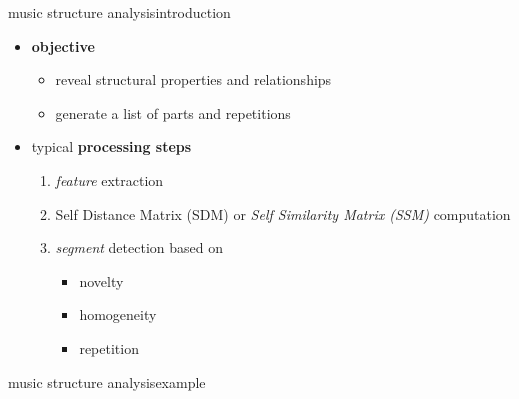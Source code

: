         \begin{frame}{music structure analysis}{introduction}
            \begin{itemize}
                \item   \textbf{objective}
                    \begin{itemize}
                        \item   reveal structural properties and relationships
                        \item   generate a list of parts and repetitions
                    \end{itemize}
                \bigskip
                \item   typical \textbf{processing steps}
                    \begin{enumerate}
                        \item   \textit{feature} extraction
                        \smallskip
                        \item   Self Distance Matrix (SDM) or \textit{Self Similarity Matrix (SSM)} computation
                        \smallskip
                        \item   \textit{segment} detection based on
                            \begin{itemize}
                                \item novelty
                                \item homogeneity
                                \item repetition
                            \end{itemize}
                    \end{enumerate}
            \end{itemize}
        \end{frame}
        \begin{frame}{music structure analysis}{example}
            {}
        \end{frame}
    
